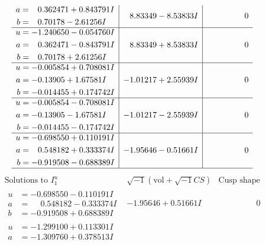 \documentclass[1p]{elsarticle_modified}
\theoremstyle{definition}
\newcommand{\I}{\sqrt{-1}}
\begin{document}
$$\begin{array}{c|c|c}
\begin{aligned}
a &= \phantom{-}0.362471 + 0.843791 I \\
b &= \phantom{-}0.70178 - 2.61256 I\end{aligned}
 & \phantom{-}8.83349 - 8.53833 I & \phantom{-0.000000 } 0 \\ \hline\begin{aligned}
u &= -1.240650 - 0.054760 I \\
a &= \phantom{-}0.362471 - 0.843791 I \\
b &= \phantom{-}0.70178 + 2.61256 I\end{aligned}
 & \phantom{-}8.83349 + 8.53833 I & \phantom{-0.000000 } 0 \\ \hline\begin{aligned}
u &= -0.005854 + 0.708081 I \\
a &= -0.13905 + 1.67581 I \\
b &= -0.014455 + 0.174742 I\end{aligned}
 & -1.01217 + 2.55939 I & \phantom{-0.000000 } 0 \\ \hline\begin{aligned}
u &= -0.005854 - 0.708081 I \\
a &= -0.13905 - 1.67581 I \\
b &= -0.014455 - 0.174742 I\end{aligned}
 & -1.01217 - 2.55939 I & \phantom{-0.000000 } 0 \\ \hline\begin{aligned}
u &= -0.698550 + 0.110191 I \\
a &= \phantom{-}0.548182 + 0.333374 I \\
b &= -0.919508 - 0.688389 I\end{aligned}
 & -1.95646 - 0.51661 I & \phantom{-0.000000 } 0\\
 \hline 
 \end{array}$$\newpage$$\begin{array}{c|c|c}  
\text{Solutions to }I^u_{1}& \I (\text{vol} + \sqrt{-1}CS) & \text{Cusp shape}\\
 \hline 
\begin{aligned}
u &= -0.698550 - 0.110191 I \\
a &= \phantom{-}0.548182 - 0.333374 I \\
b &= -0.919508 + 0.688389 I\end{aligned}
 & -1.95646 + 0.51661 I & \phantom{-0.000000 } 0 \\ \hline\begin{aligned}
u &= -1.299100 + 0.113301 I \\
a &= -1.309760 + 0.378513 I \\

\end{aligned}
\end{array}$$
\end{document}
